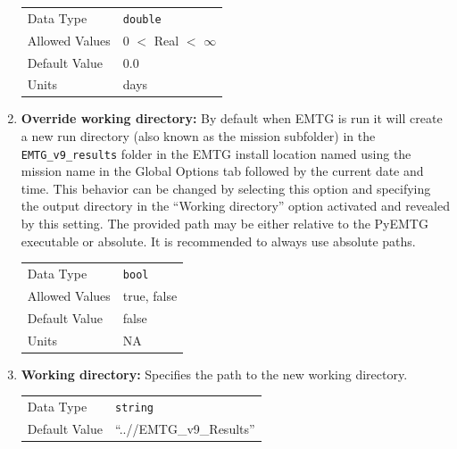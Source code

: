 \begin{enumerate}
        \begin{table}[H]
            \hspace{2cm}
            \begin{tabular}{ll}
            Data Type & \verb|double| \\
            Allowed Values & 0 $<$ Real $<$ $\infty$ \\
            Default Value & 0.0 \\
            Units & days
            \end{tabular}
        \end{table}

    \item{\textbf{Override working directory:}} By default when \ac{EMTG} is run it will create a new run directory (also known as the mission subfolder) in the \verb|EMTG_v9_results| folder in the \ac{EMTG} install location named using the mission name in the Global Options tab followed by the current date and time. This behavior can be changed by selecting this option and specifying the output directory in the ``Working directory'' option activated and revealed by this setting. The provided path may be either relative to the PyEMTG executable or absolute. It is recommended to always use absolute paths.
    
        \begin{table}[H]
            \hspace{2cm}
            \begin{tabular}{ll}
            Data Type & \verb|bool| \\
            Allowed Values & true, false \\
            Default Value & false \\
            Units & NA
            \end{tabular}
        \end{table}

        \item{\textbf{Working directory:}} Specifies the path to the new working directory.
        
            \begin{table}[H]
                \hspace{2cm}
                \begin{tabular}{ll}
                Data Type & \verb|string| \\
                Default Value & ``..//\ac{EMTG}\_v9\_Results'' \\
                \end{tabular}
            \end{table}


\end{enumerate}
